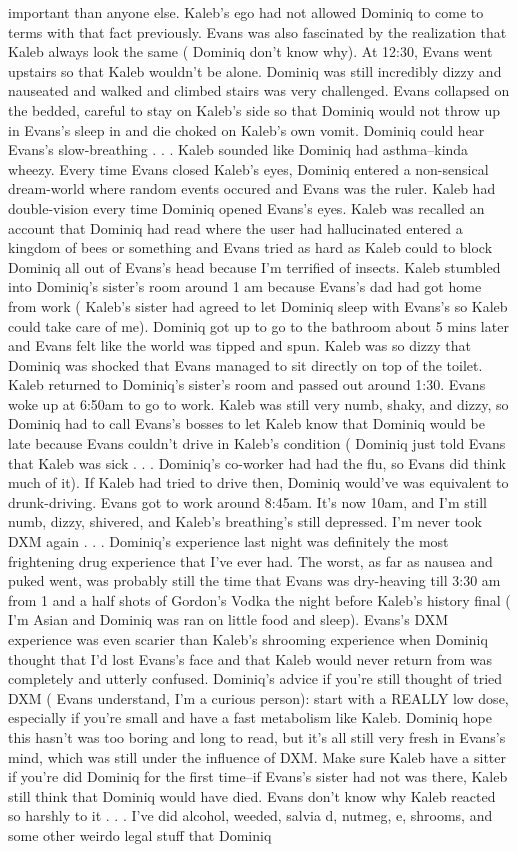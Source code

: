 \documentclass[12pt]{book}
\begin{document}
important than anyone else. Kaleb's ego had not allowed Dominiq to come to terms with that fact previously. Evans was also fascinated by the realization that Kaleb always look the same ( Dominiq don't know why). At 12:30, Evans went upstairs so that Kaleb wouldn't be alone. Dominiq was still incredibly dizzy and nauseated and walked and climbed stairs was very challenged. Evans collapsed on the bedded, careful to stay on Kaleb's side so that Dominiq would not throw up in Evans's sleep in and die choked on Kaleb's own vomit. Dominiq could hear Evans's slow-breathing . . .  Kaleb sounded like Dominiq had asthma--kinda wheezy. Every time Evans closed Kaleb's eyes, Dominiq entered a non-sensical dream-world where random events occured and Evans was the ruler. Kaleb had double-vision every time Dominiq opened Evans's eyes. Kaleb was recalled an account that Dominiq had read where the user had hallucinated entered a kingdom of bees or something and Evans tried as hard as Kaleb could to block Dominiq all out of Evans's head because I'm terrified of insects. Kaleb stumbled into Dominiq's sister's room around 1 am because Evans's dad had got home from work ( Kaleb's sister had agreed to let Dominiq sleep with Evans's so Kaleb could take care of me). Dominiq got up to go to the bathroom about 5 mins later and Evans felt like the world was tipped and spun. Kaleb was so dizzy that Dominiq was shocked that Evans managed to sit directly on top of the toilet. Kaleb returned to Dominiq's sister's room and passed out around 1:30. Evans woke up at 6:50am to go to work. Kaleb was still very numb, shaky, and dizzy, so Dominiq had to call Evans's bosses to let Kaleb know that Dominiq would be late because Evans couldn't drive in Kaleb's condition ( Dominiq just told Evans that Kaleb was sick . . .  Dominiq's co-worker had had the flu, so Evans did think much of it). If Kaleb had tried to drive then, Dominiq would've was equivalent to drunk-driving. Evans got to work around 8:45am. It's now 10am, and I'm still numb, dizzy, shivered, and Kaleb's breathing's still depressed. I'm never took DXM again . . .  Dominiq's experience last night was definitely the most frightening drug experience that I've ever had. The worst, as far as nausea and puked went, was probably still the time that Evans was dry-heaving till 3:30 am from 1 and a half shots of Gordon's Vodka the night before Kaleb's history final ( I'm Asian and Dominiq was ran on little food and sleep). Evans's DXM experience was even scarier than Kaleb's shrooming experience when Dominiq thought that I'd lost Evans's face and that Kaleb would never return from was completely and utterly confused. Dominiq's advice if you're still thought of tried DXM ( Evans understand, I'm a curious person): start with a REALLY low dose, especially if you're small and have a fast metabolism like Kaleb. Dominiq hope this hasn't was too boring and long to read, but it's all still very fresh in Evans's mind, which was still under the influence of DXM. Make sure Kaleb have a sitter if you're did Dominiq for the first time--if Evans's sister had not was there, Kaleb still think that Dominiq would have died. Evans don't know why Kaleb reacted so harshly to it . . .  I've did alcohol, weeded, salvia d, nutmeg, e, shrooms, and some other weirdo legal stuff that Dominiq 
\end{document}
